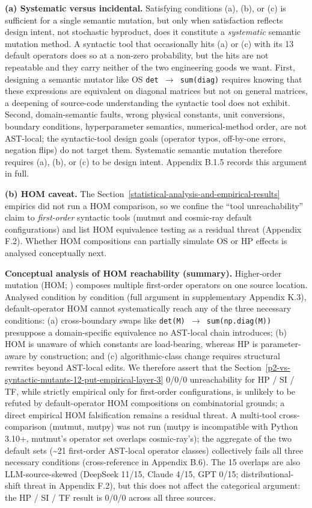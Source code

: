 \documentclass[manuscript,screen,review]{acmart}
\begin{document}
\textbf{(a) Systematic versus incidental.} Satisfying conditions (a),
(b), or (c) is sufficient for a single semantic mutation, but only when
satisfaction reflects design intent, not stochastic byproduct, does it
constitute a \emph{systematic} semantic mutation method. A syntactic
tool that occasionally hits (a) or (c) with its 13 default operators
does so at a non-zero probability, but the hits are not repeatable and
they carry neither of the two engineering goods we want. First,
designing a semantic mutator like OS \texttt{det\ $\to$\ sum(diag)} requires
knowing that these expressions are equivalent on diagonal matrices but
not on general matrices, a deepening of source-code understanding the
syntactic tool does not exhibit. Second, domain-semantic faults, wrong
physical constants, unit conversions, boundary conditions,
hyperparameter semantics, numerical-method order, are not AST-local; the
syntactic-tool design goals (operator typos, off-by-one errors, negation
flips) do not target them. Systematic semantic mutation therefore
requires (a), (b), or (c) to be design intent. Appendix B.1.5 records
this argument in full.

\textbf{(b) HOM caveat.} The Section~\ref{statistical-analysis-and-empirical-results}
empirics did not run a HOM comparison, so we confine the ``tool
unreachability'' claim to \emph{first-order} syntactic tools (mutmut and
cosmic-ray default configurations) and list HOM equivalence testing as a
residual threat (Appendix F.2). Whether HOM
\citep{jia2009hom,kintis2018effective} compositions can partially
simulate OS or HP effects is analysed conceptually next.

\textbf{Conceptual analysis of HOM reachability (summary).} Higher-order
mutation (HOM; \citealp{jia2008subtle,jia2009hom,kintis2018effective}) composes
multiple first-order operators on one source location. Analysed condition by
condition (full argument in supplementary Appendix K.3), default-operator HOM
cannot systematically reach any of the three necessary conditions: (a)
cross-boundary swaps like \texttt{det(M)\ $\to$\ sum(np.diag(M))} presuppose a
domain-specific equivalence no AST-local chain introduces; (b) HOM is unaware of
which constants are load-bearing, whereas HP is parameter-aware by construction;
and (c) algorithmic-class change requires structural rewrites beyond AST-local
edits. We therefore assert that the
Section~\ref{p2-vs-syntactic-mutants-12-put-empirical-layer-3} 0/0/0
unreachability for HP / SI / TF, while strictly empirical only for first-order
configurations, is unlikely to be refuted by default-operator HOM compositions
on combinatorial grounds; a direct empirical HOM falsification remains a
residual threat. A multi-tool cross-comparison (mutmut, mutpy) was not run
(mutpy is incompatible with Python 3.10+, mutmut's operator set overlaps
cosmic-ray's); the aggregate of the two default sets
(\textasciitilde21 first-order AST-local operator classes) collectively fails
all three necessary conditions (cross-reference in Appendix B.6). The 15
overlaps are also LLM-source-skewed (DeepSeek 11/15, Claude 4/15, GPT 0/15;
distributional-shift threat in Appendix F.2), but this does not affect the
categorical argument: the HP / SI / TF result is 0/0/0 across all three sources.
\end{document}
